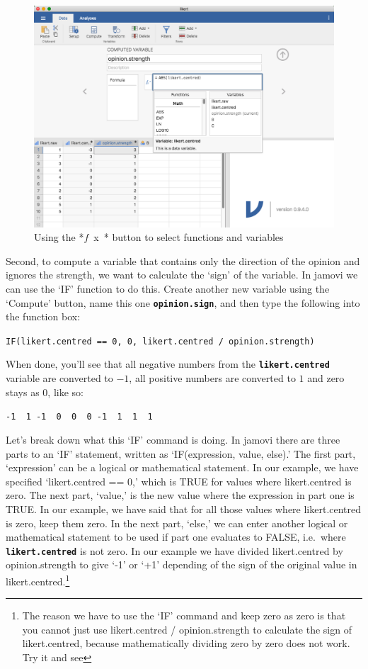 \documentclass[
]{book}
\begin{document}
\begin{figure}

{\centering \includegraphics[width=1\linewidth]{img/mechanics/opinionstrength} 

}

\caption{Using the *$f$~x~* button to select functions and variables}\label{fig:opinionstrength}
\end{figure}

Second, to compute a variable that contains only the direction of the opinion and ignores the strength, we want to calculate the `sign' of the variable. In jamovi we can use the `IF' function to do this. Create another new variable using the `Compute' button, name this one \textbf{\texttt{opinion.sign}}, and then type the following into the function box:

\texttt{IF(likert.centred\ ==\ 0,\ 0,\ likert.centred\ /\ opinion.strength)}

When done, you'll see that all negative numbers from the \textbf{\texttt{likert.centred}} variable are converted to \(-1\), all positive numbers are converted to \(1\) and zero stays as \(0\), like so:

\texttt{-1\ \ 1\ -1\ \ 0\ \ 0\ \ 0\ -1\ \ 1\ \ 1\ \ 1}

Let's break down what this `IF' command is doing. In jamovi there are three parts to an `IF' statement, written as `IF(expression, value, else).' The first part, `expression' can be a logical or mathematical statement. In our example, we have specified `likert.centred == 0,' which is TRUE for values where likert.centred is zero. The next part, `value,' is the new value where the expression in part one is TRUE. In our example, we have said that for all those values where likert.centred is zero, keep them zero. In the next part, `else,' we can enter another logical or mathematical statement to be used if part one evaluates to FALSE, i.e.~where \textbf{\texttt{likert.centred}} is not zero. In our example we have divided likert.centred by opinion.strength to give `-1' or `+1' depending of the sign of the original value in likert.centred.\footnote{The reason we have to use the `IF' command and keep zero as zero is that you cannot just use likert.centred / opinion.strength to calculate the sign of likert.centred, because mathematically dividing zero by zero does not work. Try it and see}
\end{document}

